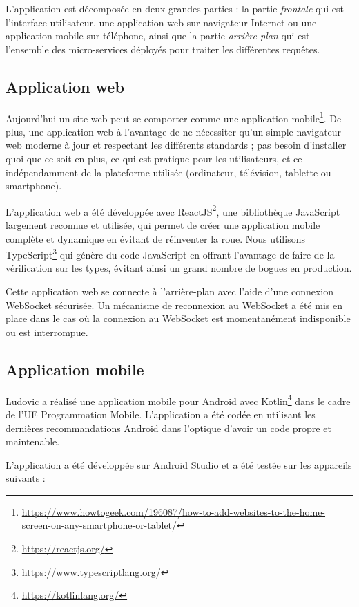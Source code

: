L'application est décomposée en deux grandes parties : la partie
\textit{frontale} qui est l'interface utilisateur, une application web sur
navigateur Internet ou une application mobile sur téléphone, ainsi que
la partie \textit{arrière-plan} qui est l'ensemble des micro-services
déployés pour traiter les différentes requêtes.

\subsection{Application web}

Aujourd'hui un site web peut se comporter comme une application
mobile\footnote{
  \url{https://www.howtogeek.com/196087/how-to-add-websites-to-the-home-screen-on-any-smartphone-or-tablet/}}.
De plus, une application web à l'avantage de ne nécessiter qu'un simple
navigateur web moderne à jour et respectant les différents standards ;
pas besoin d'installer quoi que ce soit en plus, ce qui est pratique
pour les utilisateurs, et ce indépendamment de la plateforme utilisée
(ordinateur, télévision, tablette ou smartphone).

L'application web a été développée avec
ReactJS\footnote{\url{https://reactjs.org/}}, une
bibliothèque JavaScript largement reconnue et utilisée, qui permet de
créer une application mobile complète et dynamique en évitant de
réinventer la roue. Nous utilisons
TypeScript\footnote{\url{https://www.typescriptlang.org/}}
qui génère du code JavaScript en offrant l'avantage de faire de la
vérification sur les types, évitant ainsi un grand nombre de bogues en
production.

Cette application web se connecte à l'arrière-plan avec l'aide d'une
connexion WebSocket sécurisée. Un mécanisme de reconnexion au WebSocket
a été mis en place dans le cas où la connexion au WebSocket est
momentanément indisponible ou est interrompue.

\subsection{Application mobile}

Ludovic a réalisé une application mobile pour Android avec
Kotlin\footnote{\url{https://kotlinlang.org/}} dans
le cadre de l'UE Programmation Mobile. L'application a été codée en
utilisant les dernières recommandations Android dans l'optique d'avoir
un code propre et maintenable.

L'application a été développée sur Android Studio et a été testée sur
les appareils suivants :

